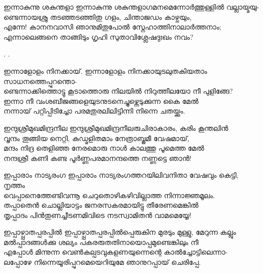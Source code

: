 \begin{enumerate}

\begin{slokam}{\VSv}{\KKN}{ഇന്നാകുന്നു ശകുന്തളാ}
ഇന്നാകുന്നു ശകുന്തളാഗമനമെന്നോർത്തുള്ളിൽ വല്ലായ്മയു-\\
ണ്ടെന്നായശ്രു തടഞ്ഞടഞ്ഞിതു ഗളം, ചിന്താജഡം കാഴ്ചയും,\\
എന്നേ! കാനനവാസി ഞാനുമിതുപോൽ സ്നേഹാത്തിനാലാർത്തനാം; \\
എന്നാലെങ്ങനെ താങ്ങിടും ഗൃഹി സുതാവിശ്ലേഷദുഃഖം നവം? 
\end{slokam}



. 
.


\begin{slokam}{\VSr}{\Unk}{ഇന്നാളോളം നിനക്കായ്.}
ഇന്നാളോളം നിനക്കായുടലുതകിയതാം സാധനത്തെപ്പുറന്തൊ-\\
ണ്ടെന്നാക്കിത്തൊട്ടു കൂടാത്തൊരു നിലയിൽ നിറുത്തീലയോ നീ പുളിങ്ങേ?\\
ഇന്നാ നീ വംശബീജങ്ങളെയുടനുടനെച്ചുഴ്ന്നെടുക്കുന്ന കൈ മേൽ\\
നന്നായ് പറ്റിപ്പിടിച്ചോ പരമതുരലിലിട്ടിന്നി നിന്നെ ചതയ്ക്കും.
\end{slokam}


\begin{slokam}{\VSv}{\Ottoor}{ഇന്ദുശ്രീമുഖമിന്ദ്രനീല}
ഇന്ദുശ്രീമുഖമിന്ദ്രനീലരുചിരാകാരം, കരിം കൂന്തലിൻ\\
വൃന്ദം തൂങ്ങിയ നെറ്റി, കുഡ്മളിതമാം നേത്രാബ്ജമീ വേഷമായ്,\\
മന്ദം നിദ്ര തെളിഞ്ഞ നേരമൊരു നാൾ കാലത്തു പൂമെത്ത മേൽ\\
നന്ദശ്രീ കണി കണ്ട പൂർണ്ണപരമാനന്ദത്തെ നണ്ണട്ടെ ഞാൻ!
\end{slokam}



\begin{slokam}{\VSr}{\VNM}{ഇപ്പാരാം നാട്യരംഗ}
ഇപ്പാരാം നാട്യരംഗത്തറയിലിവനിതാ വേഷവും കെട്ടി, നൃത്തം\\
വെപ്പാനെത്തേണ്ടിവന്നൂ ചെറുതൊഴികഴിവില്ലാത്ത നിന്നാജ്ഞമൂലം.\\
തപ്പാതെൻ ചൊല്ലിയാട്ടം ജനരസകരമായിട്ടു തീരേണമെങ്കിൽ\\
തൃപ്പാദം പിൻതുണച്ചീടണമിവിടെ നടസ്വാമിതൻ വാമമെയ്യേ!
\end{slokam}



\begin{slokam}{\VSr}{\RV}{ഇപ്പാഴ്പ്പാതപ്പരപ്പിൽ‌}
ഇപ്പാഴ്പ്പാതപ്പരപ്പിൽ‌പ്പെരുകിന മുരടും മുള്ളു, മേറുന്ന കല്ലും\\
മൽ‌പ്പാദങ്ങൾക്കു ശല്യം പകരരുതതിനായൊപ്പമുണ്ടെങ്കിലും നീ\\
എപ്പോൾ മിന്നുന്ന വെൺകല്പടവുകളണയുന്നെന്റെ കാൽച്ചോട്ടിലെന്നാ-\\
ലപ്പോഴേ നിന്നെയൂരിപ്പുറമെയെറിയുമേ ഞാനുറപ്പായ് ചെരിപ്പേ.
\end{slokam}


\end{enumerate}
